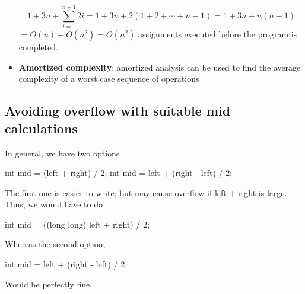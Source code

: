 \documentclass{report}
\begin{document}
\begin{itemize}
\[
1 + 3n + \sum_{i=1}^{n-1} 2i = 1 + 3n + 2(1 + 2 + \cdots + n - 1) = 1 + 3n + n(n - 1)
\]
$= O(n) + O(n^2) = O(n^2)$ assignments executed before the program is completed.
\item \textbf{Amortized complexity}: amortized analysis can be used
to find the average complexity of a worst case sequence of operations

















   \end{itemize}

   \pagebreak 
   \bigbreak \noindent 
   \subsection{Avoiding overflow with suitable mid calculations}
   \bigbreak \noindent 
   In general, we have two options
   \bigbreak \noindent 
   \begin{cppcode}
   int mid = (left + right) / 2;
   int mid = left + (right - left) / 2;
   \end{cppcode}
   \bigbreak \noindent 
   The first one is easier to write, but may cause overflow if left + right is large. Thus, we would have to do 
   \bigbreak \noindent 
   \begin{cppcode}
    int mid = ((long long) left + right) / 2;   
   \end{cppcode}
   \bigbreak \noindent 
   Whereas the second option,
   \bigbreak \noindent 
   \begin{cppcode}
   int mid = left + (right - left) / 2;
   \end{cppcode}
   \bigbreak \noindent 
   Would be perfectly fine.



   \bigbreak \noindent 
\end{document}
